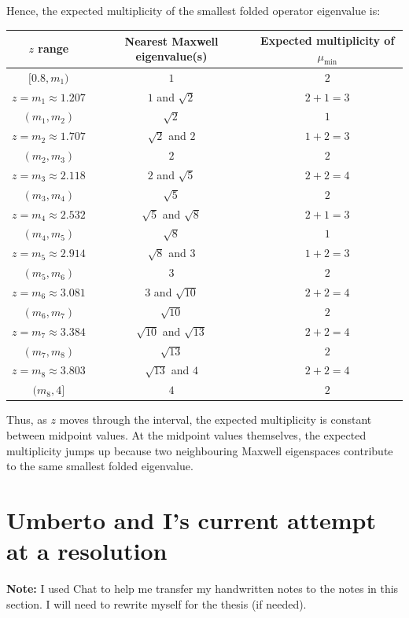 \documentclass[12pt,a4paper]{article}
\begin{document}
\newpage
Hence, the expected multiplicity of the smallest folded operator eigenvalue is:
\begin{center}
\small
\begin{longtable}{|c| c| c|}
\toprule
$z$ range & Nearest Maxwell eigenvalue(s) & Expected multiplicity of $\mu_{\min}$ \\
\midrule
\endhead
$[0.8,m_1)$ & $1$ & $2$ \\
$z=m_1\approx 1.207$ & $1$ and $\sqrt{2}$ & $2+1=3$ \\
$(m_1,m_2)$ & $\sqrt{2}$ & $1$ \\
$z=m_2\approx 1.707$ & $\sqrt{2}$ and $2$ & $1+2=3$ \\
$(m_2,m_3)$ & $2$ & $2$ \\
$z=m_3\approx 2.118$ & $2$ and $\sqrt{5}$ & $2+2=4$ \\
$(m_3,m_4)$ & $\sqrt{5}$ & $2$ \\
$z=m_4\approx 2.532$ & $\sqrt{5}$ and $\sqrt{8}$ & $2+1=3$ \\
$(m_4,m_5)$ & $\sqrt{8}$ & $1$ \\
$z=m_5\approx 2.914$ & $\sqrt{8}$ and $3$ & $1+2=3$ \\
$(m_5,m_6)$ & $3$ & $2$ \\
$z=m_6\approx 3.081$ & $3$ and $\sqrt{10}$ & $2+2=4$ \\
$(m_6,m_7)$ & $\sqrt{10}$ & $2$ \\
$z=m_7\approx 3.384$ & $\sqrt{10}$ and $\sqrt{13}$ & $2+2=4$ \\
$(m_7,m_8)$ & $\sqrt{13}$ & $2$ \\
$z=m_8\approx 3.803$ & $\sqrt{13}$ and $4$ & $2+2=4$ \\
$(m_8,4]$ & $4$ & $2$ \\
\bottomrule
\end{longtable}
\end{center}

Thus, as $z$ moves through the interval, the expected multiplicity is constant
between midpoint values. At the midpoint values themselves, the expected
multiplicity jumps up because two neighbouring Maxwell eigenspaces contribute to
the same smallest folded eigenvalue.



\section{Umberto and I's current attempt at a resolution}

\textbf{Note:} I used Chat to help me transfer my handwritten notes to the notes in this section. I will need to rewrite myself for the thesis (if needed).
\end{document}

